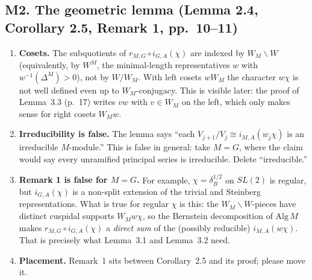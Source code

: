 \documentclass[11pt]{article}
\begin{document}
\subsection*{M2. The geometric lemma (Lemma 2.4, Corollary 2.5, Remark 1, pp.~10--11)}
\begin{enumerate}[label=(\alph*)]
\item \textbf{Cosets.} The subquotients of $r_{M,G}\circ i_{G,A}(\chi)$ are indexed by $W_M\backslash W$ (equivalently, by $W^{M}$, the minimal-length representatives $w$ with $w^{-1}(\Delta^M)>0$), not by $W/W_M$. With left cosets $wW_M$ the character $w\chi$ is not well defined even up to $W_M$-conjugacy. This is visible later: the proof of Lemma~3.3 (p.~17) writes $vw$ with $v\in W_M$ on the left, which only makes sense for right cosets $W_Mw$.
\item \textbf{Irreducibility is false.} The lemma says ``each $V_{j+1}/V_j\cong i_{M,A}(w_j\chi)$ is an irreducible $M$-module.'' This is false in general: take $M=G$, where the claim would say every unramified principal series is irreducible. Delete ``irreducible.''
\item \textbf{Remark 1 is false for $M=G$.} For example, $\chi=\delta_B^{1/2}$ on $SL(2)$ is regular, but $i_{G,A}(\chi)$ is a non-split extension of the trivial and Steinberg representations. What is true for regular $\chi$ is this: the $W_M\backslash W$-pieces have distinct cuspidal supports $W_M w\chi$, so the Bernstein decomposition of $\mathrm{Alg}\,M$ makes $r_{M,G}\circ i_{G,A}(\chi)$ a \emph{direct sum} of the (possibly reducible) $i_{M,A}(w\chi)$. That is precisely what Lemma~3.1 and Lemma~3.2 need.
\item \textbf{Placement.} Remark~1 sits between Corollary~2.5 and its proof; please move it.
\end{enumerate}
\end{document}

